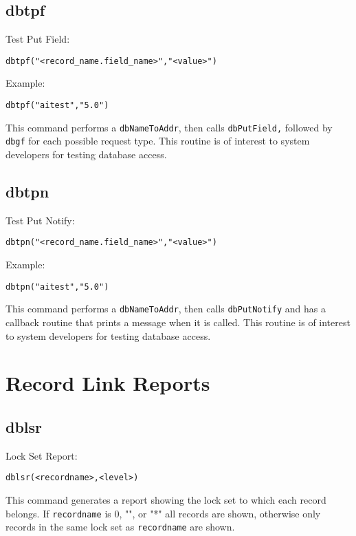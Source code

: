 \subsection{dbtpf}

Test Put Field:

\begin{verbatim}dbtpf("<record_name.field_name>","<value>")
\end{verbatim}Example:

\begin{verbatim}dbtpf("aitest","5.0")
\end{verbatim}This command performs a \verb|dbNameToAddr|, then calls \verb|dbPutField,| followed by \verb|dbgf| for each possible request type. 
This routine is of interest to system developers for testing database access.

\subsection{dbtpn}

Test Put Notify:

\begin{verbatim}dbtpn("<record_name.field_name>","<value>")
\end{verbatim}Example:

\begin{verbatim}dbtpn("aitest","5.0")
\end{verbatim}This command performs a \verb|dbNameToAddr|, then calls \verb|dbPutNotify| and has a callback routine that prints a message 
when it is called. This routine is of interest to system developers for testing database access.

\section{Record Link Reports}

\subsection{dblsr}

Lock Set Report:

\begin{verbatim}dblsr(<recordname>,<level>)
\end{verbatim}This command generates a report showing the lock set to which each record belongs. If \verb|recordname| is 0, "", or "*" all 
records are shown, otherwise only records in the same lock set as \verb|recordname| are shown.

